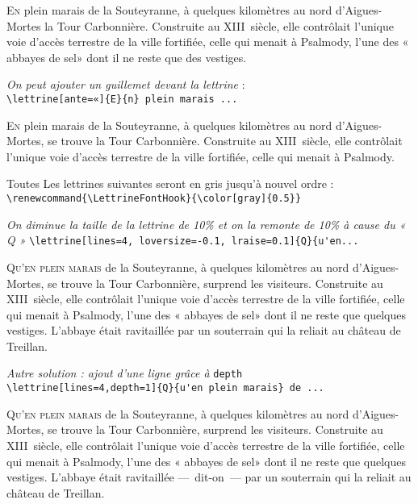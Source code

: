 \documentclass[paper=a4,12pt,german,french]{scrartcl}
\begin{document}
\lettrine[lines=3, lhang=0.33, loversize=0.25]{E}{n}
plein marais de la Souteyranne,
à quelques kilomètres au nord d'Aigues-Mortes la Tour Carbonnière.
Construite au XIII\ieme~siècle, elle contrôlait l'unique voie d'accès
terrestre de la ville fortifiée, celle qui menait à Psalmody,
l'une des « abbayes de sel» dont il ne reste que des vestiges.

\vspace{\baselineskip}
\textit{On peut ajouter un guillemet devant la lettrine} :\\
\verb+\lettrine[ante=«]{E}{n} plein marais ...+

\lettrine[ante=«]{E}{n} plein marais de la Souteyranne,
à quelques kilomètres au nord d'Aigues-Mortes, se trouve
la Tour Carbonnière.
Construite au XIII\ieme~siècle, elle contrôlait l'unique voie d'accès
terrestre de la ville fortifiée, celle qui menait à Psalmody.

\newpage
Toutes Les lettrines suivantes  seront en gris jusqu'à nouvel ordre : \\
\verb+\renewcommand{\LettrineFontHook}{\color[gray]{0.5}}+
\renewcommand{\LettrineFontHook}{\color[gray]{0.5}}

\vspace{.5\baselineskip}
\textit{On diminue la taille de la lettrine de 10\% et on
la remonte de 10\%  à cause du « Q »}
\verb+\lettrine[lines=4, loversize=-0.1, lraise=0.1]{Q}{u'en...+

\lettrine[lines=4, loversize=-0.1, lraise=0.1]{Q}{u'en plein marais}
 de la Souteyranne, à quelques kilomètres au nord d'Aigues-Mortes,
se trouve la Tour Carbonnière, surprend les visiteurs.
Construite au XIII\ieme~siècle, elle contrôlait l'unique voie d'accès
terrestre de la ville fortifiée, celle qui menait à Psalmody,
l'une des « abbayes de sel» dont il ne reste que quelques vestiges.
L'abbaye était ravitaillée par un souterrain qui
la reliait au château de Treillan.

\vspace{.5\baselineskip}
\textit{Autre solution : ajout d’une ligne grâce à} \verb+depth+\\
\verb+\lettrine[lines=4,depth=1]{Q}{u'en plein marais} de ...+

\lettrine[lines=4,depth=1]{Q}{u'en plein marais} de la Souteyranne,
à quelques kilomètres au nord d'Aigues-Mortes,
se trouve la Tour Carbonnière, surprend les visiteurs.
Construite au XIII\ieme~siècle, elle contrôlait l'unique voie d'accès
terrestre de la ville fortifiée, celle qui menait à Psalmody,
l'une des « abbayes de sel» dont il ne reste que quelques vestiges.
L'abbaye était ravitaillée ---~dit-on~--- par un souterrain qui
la reliait au château de Treillan.
\end{document}

